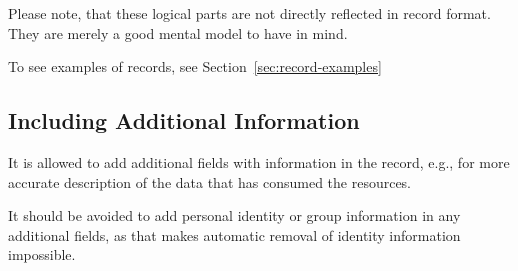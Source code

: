Please note, that these logical parts are not directly reflected in record 
format. They are merely a good mental model to have in mind.

To see examples of records, see Section~\ref{sec:record-examples}


\subsection{Including Additional Information}

It is allowed to add additional fields with information in the record, e.g.,
for more accurate description of the data that has consumed the resources.

It should be avoided to add personal identity or group information in any
additional fields, as that makes automatic removal of identity information
impossible.




